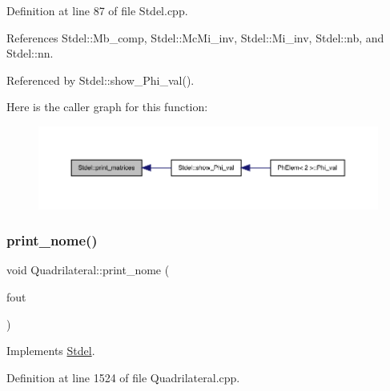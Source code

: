 Definition at line 87 of file Stdel.\+cpp.



References Stdel\+::\+Mb\+\_\+comp, Stdel\+::\+Mc\+Mi\+\_\+inv, Stdel\+::\+Mi\+\_\+inv, Stdel\+::nb, and Stdel\+::nn.



Referenced by Stdel\+::show\+\_\+\+Phi\+\_\+val().

Here is the caller graph for this function\+:
\nopagebreak
\begin{figure}[H]
\begin{center}
\leavevmode
\includegraphics[width=350pt]{classStdel_a319e6a16011b22e12028a841b7686f03_icgraph}
\end{center}
\end{figure}
\mbox{\label{classQuadrilateral_a3e28c85566a11cf7cd22d91d3b031826}} 
\subsubsection{\texorpdfstring{print\+\_\+nome()}{print\_nome()}}
{\footnotesize\ttfamily void Quadrilateral\+::print\+\_\+nome (\begin{DoxyParamCaption}\item[{F\+I\+LE $\ast$}]{fout }\end{DoxyParamCaption})\hspace{0.3cm}{\ttfamily [virtual]}}



Implements \hyperlink{classStdel_ac654f45f744ec4cfeab74ed4ded99ef5}{Stdel}.



Definition at line 1524 of file Quadrilateral.\+cpp.

\mbox{\label{classQuadrilateral_a26cf4e787eb83848937831b5e388a05f}} 

